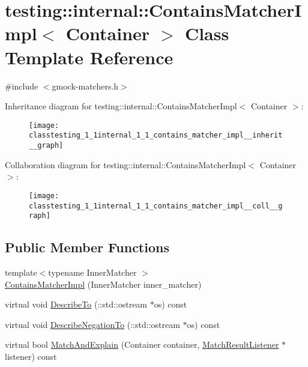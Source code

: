\hypertarget{classtesting_1_1internal_1_1_contains_matcher_impl}{}\section{testing\+:\+:internal\+:\+:Contains\+Matcher\+Impl$<$ Container $>$ Class Template Reference}
\label{classtesting_1_1internal_1_1_contains_matcher_impl}


{\ttfamily \#include $<$gmock-\/matchers.\+h$>$}



Inheritance diagram for testing\+:\+:internal\+:\+:Contains\+Matcher\+Impl$<$ Container $>$\+:
\nopagebreak
\begin{figure}[H]
\begin{center}
\leavevmode
\texttt{[image: classtesting\_1\_1internal\_1\_1\_contains\_matcher\_impl\_\_inherit\_\_graph]}
\end{center}
\end{figure}


Collaboration diagram for testing\+:\+:internal\+:\+:Contains\+Matcher\+Impl$<$ Container $>$\+:
\nopagebreak
\begin{figure}[H]
\begin{center}
\leavevmode
\texttt{[image: classtesting\_1\_1internal\_1\_1\_contains\_matcher\_impl\_\_coll\_\_graph]}
\end{center}
\end{figure}
\subsection*{Public Member Functions}
\begin{DoxyCompactItemize}
\item 
{\footnotesize template$<$typename Inner\+Matcher $>$ }\\\hyperlink{classtesting_1_1internal_1_1_contains_matcher_impl_a3fd56f21081068101a76ebe05fc1d7f4}{Contains\+Matcher\+Impl} (Inner\+Matcher inner\+\_\+matcher)
\item 
virtual void \hyperlink{classtesting_1_1internal_1_1_contains_matcher_impl_a8fa3ebe5a6ba6ccc21c6f9aa6c6bbdb9}{Describe\+To} (\+::std\+::ostream $\ast$os) const 
\item 
virtual void \hyperlink{classtesting_1_1internal_1_1_contains_matcher_impl_aa8448326064567a1c61ef027a241459c}{Describe\+Negation\+To} (\+::std\+::ostream $\ast$os) const 
\item 
virtual bool \hyperlink{classtesting_1_1internal_1_1_contains_matcher_impl_aa70ab361eb1d4f2aa01d2cee3ef4cb25}{Match\+And\+Explain} (Container container, \hyperlink{classtesting_1_1_match_result_listener}{Match\+Result\+Listener} $\ast$listener) const 
\end{DoxyCompactItemize}
